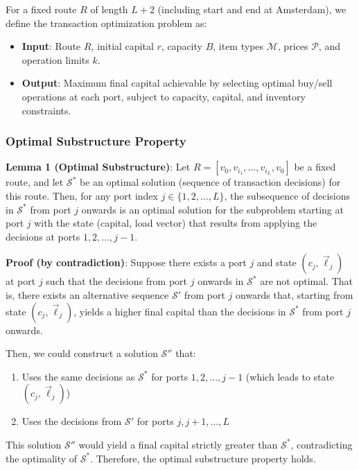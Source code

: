 \documentclass[12pt]{article}
\begin{document}
For a fixed route $R$ of length $L+2$ (including start and end at Amsterdam), we define the transaction optimization problem as:
\begin{itemize}
    \item \textbf{Input}: Route $R$, initial capital $r$, capacity $B$, item types $\mathcal{M}$, prices $\mathcal{P}$, and operation limits $k$.
    \item \textbf{Output}: Maximum final capital achievable by selecting optimal buy/sell operations at each port, subject to capacity, capital, and inventory constraints.
\end{itemize}

\subsubsection{Optimal Substructure Property}

\textbf{Lemma 1 (Optimal Substructure)}: Let $R = [v_0, v_{i_1}, ..., v_{i_L}, v_0]$ be a fixed route, and let $\mathcal{S}^*$ be an optimal solution (sequence of transaction decisions) for this route. Then, for any port index $j \in \{1, 2, ..., L\}$, the subsequence of decisions in $\mathcal{S}^*$ from port $j$ onwards is an optimal solution for the subproblem starting at port $j$ with the state (capital, load vector) that results from applying the decisions at ports $1, 2, ..., j-1$.

\textbf{Proof (by contradiction)}: Suppose there exists a port $j$ and state $(c_j, \vec{\ell}_j)$ at port $j$ such that the decisions from port $j$ onwards in $\mathcal{S}^*$ are not optimal. That is, there exists an alternative sequence $\mathcal{S}'$ from port $j$ onwards that, starting from state $(c_j, \vec{\ell}_j)$, yields a higher final capital than the decisions in $\mathcal{S}^*$ from port $j$ onwards. 

Then, we could construct a solution $\mathcal{S}''$ that:
\begin{enumerate}
    \item Uses the same decisions as $\mathcal{S}^*$ for ports $1, 2, ..., j-1$ (which leads to state $(c_j, \vec{\ell}_j)$)
    \item Uses the decisions from $\mathcal{S}'$ for ports $j, j+1, ..., L$
\end{enumerate}

This solution $\mathcal{S}''$ would yield a final capital strictly greater than $\mathcal{S}^*$, contradicting the optimality of $\mathcal{S}^*$. Therefore, the optimal substructure property holds.
\end{document}
